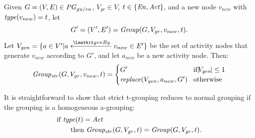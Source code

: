 \begin{definition}
Given 
$G=(V,E) \in \mathit{PG}_{gu/ea}$, $V_{gr} \in V$, $t \in \{\mathit{En}, \mathit{Act}\}$, and a new node $v_{new}$ with $\mathit{type}(v_{new}) = t$, let
\[ G' = (V',E') = \mathit{Group}(G, V_{gr}, v_{new}, t). \]
Let 
$V_{gen} = \{ a \in V' |  a \xleftarrow{\wgby} v_{new} \in E' \}$ be the set of activity nodes that generate $v_{new}$ according to $G'$, and let $a_{new}$ be a new activity node. Then:
\begin{equation*}
\mathit{Group_{str}}(G, V_{gr},v_{new}, t)=
\begin{cases}
G' & \!\text{if}  |\!V_{gen}\!| \leq 1  \\
\mathit{replace}(V_{gen}, a_{new}, G') & \!\text{otherwise } 
\end{cases}
\end{equation*}
\label{def:strict-t-grouping}
\end{definition}

% 
% 


It is straightforward to show that strict t-grouping reduces to normal grouping if the grouping is a homogeneous a-grouping:
\begin{align*}
&\text{if } \mathit{type}(t) =  \mathit{Act} \\
 &\qquad\text{then } \mathit{Group_{str}}(G, V_{gr},t) = \mathit{Group}(G, V_{gr},t). 
\end{align*}



